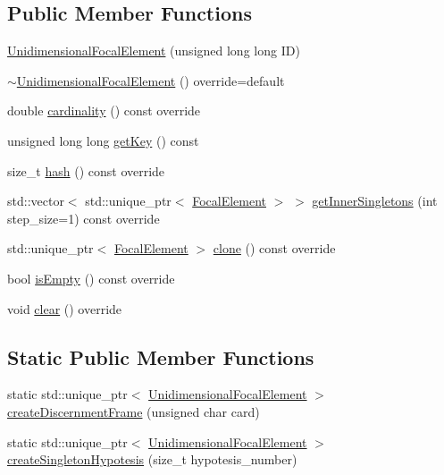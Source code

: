 \subsection*{Public Member Functions}
\begin{DoxyCompactItemize}
\item 
\hyperlink{classUnidimensionalFocalElement_a634c688c14ef7a5a561dedf62e4cb0c3}{Unidimensional\+Focal\+Element} (unsigned long long I\+D)
\item 
\hyperlink{classUnidimensionalFocalElement_a0750b8a513e6ca16fdb94ff8012b78de}{$\sim$\+Unidimensional\+Focal\+Element} () override=default
\item 
double \hyperlink{classUnidimensionalFocalElement_a22e013e2875cf07f23b3fe8ab2e2431f}{cardinality} () const override
\item 
unsigned long long \hyperlink{classUnidimensionalFocalElement_a398bbc7cb6cabc000e549161323c3cf4}{get\+Key} () const 
\item 
size\+\_\+t \hyperlink{classUnidimensionalFocalElement_a073ce6e51cb7fff32b53e5f7b1d729c7}{hash} () const override
\item 
std\+::vector$<$ std\+::unique\+\_\+ptr$<$ \hyperlink{classFocalElement}{Focal\+Element} $>$ $>$ \hyperlink{classUnidimensionalFocalElement_ad37dc12733140cfd631d451ebfefcaf7}{get\+Inner\+Singletons} (int step\+\_\+size=1) const override
\item 
std\+::unique\+\_\+ptr$<$ \hyperlink{classFocalElement}{Focal\+Element} $>$ \hyperlink{classUnidimensionalFocalElement_aa06e27bc6c262783704883477d630d60}{clone} () const override
\item 
bool \hyperlink{classUnidimensionalFocalElement_a836c8a041ffba3e3e2ff7e584469a650}{is\+Empty} () const override
\item 
void \hyperlink{classUnidimensionalFocalElement_a1bd0c21e3e7e5a3ef78f4b47b98b6202}{clear} () override
\end{DoxyCompactItemize}
\subsection*{Static Public Member Functions}
\begin{DoxyCompactItemize}
\item 
static std\+::unique\+\_\+ptr$<$ \hyperlink{classUnidimensionalFocalElement}{Unidimensional\+Focal\+Element} $>$ \hyperlink{classUnidimensionalFocalElement_aba30678a3cd2534ea8becf0229fdb399}{create\+Discernment\+Frame} (unsigned char card)
\item 
static std\+::unique\+\_\+ptr$<$ \hyperlink{classUnidimensionalFocalElement}{Unidimensional\+Focal\+Element} $>$ \hyperlink{classUnidimensionalFocalElement_aa99e8f904b1cfdc880b41a36defe8aa5}{create\+Singleton\+Hypotesis} (size\+\_\+t hypotesis\+\_\+number)
\end{DoxyCompactItemize}



